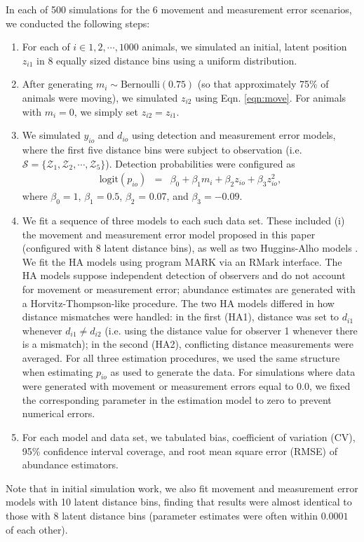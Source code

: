 \documentclass[aoas,preprint]{imsart}
\numberwithin{equation}{section}
\theoremstyle{plain}
\begin{document}
In each of 500 simulations for the 6 movement and measurement error scenarios, we conducted the following steps:
\begin{enumerate}
  \item For each of $i \in 1,2,\cdots,1000$ animals, we simulated an initial, latent position $z_{i1}$ in 8 equally sized distance bins using a uniform distribution.
  \item After generating $m_i \sim \text{Bernoulli}(0.75)$ (so that approximately 75\% of animals were moving), we simulated $z_{i2}$ using Eqn. \ref{eqn:move}.  For animals with $m_i=0$, we simply set $z_{i2}=z_{i1}$.
  \item We simulated $y_{io}$ and $d_{io}$ using detection and measurement error models, where the first five distance bins were subject to observation (i.e. $\mathcal{S} = \{ \mathcal{Z}_1, \mathcal{Z}_2, \cdots, \mathcal{Z}_5 \} $).  Detection probabilities were configured as
      \begin{eqnarray*}
        \text{logit}(p_{io}) & = & \beta_0 + \beta_1 m_i + \beta_2 z_{io} + \beta_3 z_{io}^2,
      \end{eqnarray*}
      where $\beta_0 = 1$, $\beta_1 = 0.5$, $\beta_2$ = 0.07, and $\beta_3 = -0.09$.
  \item We fit a sequence of three models to each such data set.  These included (i) the movement and measurement error model proposed in this paper (configured with 8 latent distance bins), as well as two Huggins-Alho models
    \citep[HA;][]{Huggins1989,Alho1990}.  We fit the HA models using program MARK \citep{WhiteBurnham1999} via an RMark \citep{Laake2013} interface. The HA models suppose independent detection of observers and do not account for movement or measurement error; abundance estimates are generated with a Horvitz-Thompson-like procedure. The two HA models differed in how distance mismatches were handled: in the first (HA1), distance was set to $d_{i1}$ whenever $d_{i1}\ne d_{i2}$ (i.e. using the distance value for observer 1 whenever there is a mismatch); in the second (HA2), conflicting distance measurements were averaged.  For all three estimation procedures, we used the same structure when estimating $p_{io}$ as used to generate the data.  For simulations where data were generated with movement or measurement errors equal to 0.0, we fixed the corresponding parameter in the estimation model to zero to prevent numerical errors.
  \item For each model and data set, we tabulated bias, coefficient of variation (CV), 95\% confidence interval coverage, and root mean square error (RMSE) of abundance estimators.
\end{enumerate}
Note that in initial simulation work, we also fit movement and measurement error models with 10 latent distance bins, finding that results were almost identical to those with 8 latent distance bins (parameter estimates were often within $0.0001$ of each other).
\end{document}
